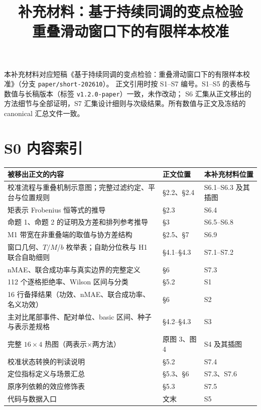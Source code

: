 \documentclass[UTF8,zihao=-4]{ctexart}
\title{补充材料：基于持续同调的变点检验\\重叠滑动窗口下的有限样本校准}
\author{}
\date{}
\theoremstyle{remark}
\begin{document}
\maketitle

本补充材料对应短稿《基于持续同调的变点检验：重叠滑动窗口下的有限样本校准》（分支 \texttt{paper/short-202610}）。
正文引用时按 S1--S7 编号。S1--S5 的表格与数值与长稿版本（标签 \texttt{v1.2.0-paper}）一致，未作改动；
S6 汇集从正文移出的方法细节与全部证明，S7 汇集设计细则与次级结果。所有数值与正文及冻结的 canonical 汇总文件一致。

\section*{S0 内容索引}

\begin{center}
\small
\begin{tabular}{p{}p{}p{}}
\toprule
被移出正文的内容 & 正文位置 & 本补充材料位置\\
\midrule
校准流程与重叠机制示意图；完整过滤约定、平台与位置规则 & \S2.2、\S2.4 & S6.1--S6.3 及其插图\\
矩表示 Frobenius 恒等式的推导 & \S2.3 & S6.4\\
命题 1、命题 2 的证明及方差和排列参考推导 & \S3 & S6.5--S6.8\\
M1 带宽在非重叠端的取值与协方差结构 & \S2.5、\S7 & S6.9\\
窗口几何、$T/M$/$b$ 枚举表；自助分位秩与 H1 联合自助细则 & \S4.1--\S4.3 & S7.1--S7.2\\
nMAE、联合成功率与真实边界的完整定义 & \S6 & S7.3\\
112 个逐格拒绝率、Wilson 区间与分类 & \S5.2 & S1\\
16 行备择结果（功效、nMAE、联合成功率、名义功效） & \S6 & S2\\
主对比尾部事件、配对单位、basic 区间、种子与表示差规格 & \S4.2--\S4.3 & S3\\
完整 $16\times4$ 热图（两表示$\times$两方法） & 原图 3、图 4 & S4 及其插图\\
校准状态转换的判读说明 & \S5.2 & S7.4\\
定位指标定义与场景汇总 & \S5.3、\S6 & S7.3、S7.6\\
原序列依赖的效应修饰表 & \S5.3 & S7.5\\
代码与数据入口 & 文末 & S5\\
\bottomrule
\end{tabular}
\end{center}
\end{document}
